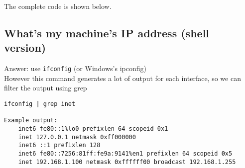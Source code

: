 \begin{Shaded}
\begin{Highlighting}[]
 \NormalTok{(} \NormalTok{(} 
\end{Highlighting}
\end{Shaded}

The complete code is shown below.

\begin{Shaded}
\begin{Highlighting}[]
     
     
     \NormalTok{host[}\NormalTok{], port[}\NormalTok{];}
     
         
         
             \NormalTok{(} 
                                \NormalTok{(} 
                                \NormalTok{(} 
            \NormalTok{\}}
        \NormalTok{\}}
\end{Highlighting}
\end{Shaded}

\subsection{What's my machine's IP address (shell
version)}\label{whats-my-machines-ip-address-shell-version}

Answer: use \texttt{ifconfig} (or Windows's ipconfig)\\However this
command generates a lot of output for each interface, so we can filter
the output using grep

\begin{verbatim}
ifconfig | grep inet

Example output:
    inet6 fe80::1%lo0 prefixlen 64 scopeid 0x1 
    inet 127.0.0.1 netmask 0xff000000 
    inet6 ::1 prefixlen 128 
    inet6 fe80::7256:81ff:fe9a:9141%en1 prefixlen 64 scopeid 0x5 
    inet 192.168.1.100 netmask 0xffffff00 broadcast 192.168.1.255
\end{verbatim}
